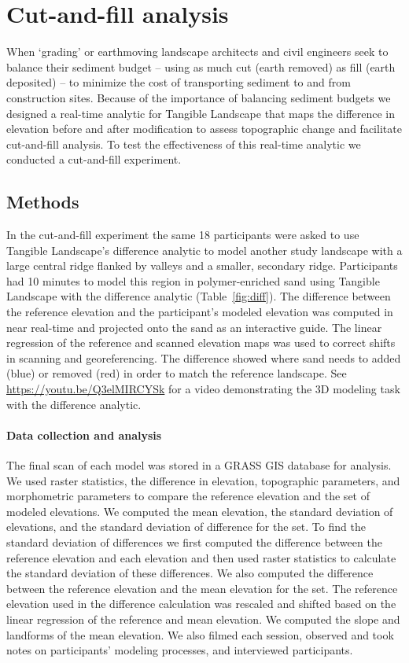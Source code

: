 \documentclass[Afour,sagev,times]{sagej} %
\begin{document}
\section{Cut-and-fill analysis}
When `grading' or earthmoving
landscape architects and civil engineers
seek to balance their sediment budget 
-- using as much cut (earth removed) 
as fill (earth deposited) --
to minimize the cost of transporting sediment 
to and from construction sites.
Because of the importance 
of balancing sediment budgets
we designed a real-time analytic 
for Tangible Landscape that 
maps the difference in elevation
before and after modification
to assess topographic change and
facilitate cut-and-fill analysis. 
To test the effectiveness of this real-time analytic
we conducted a cut-and-fill experiment.

\subsection{Methods}
In the cut-and-fill experiment 
the same 18 participants were asked to use 
Tangible Landscape's difference analytic to model 
another study landscape
with a large central ridge 
flanked by valleys 
and a smaller, secondary ridge.
Participants had 10 minutes to model this region
in polymer-enriched sand using Tangible Landscape 
with the difference analytic (Table~\ref{fig:diff}). 
The difference between the reference elevation 
and the participant's modeled elevation
was computed in near real-time and projected onto the sand 
as an interactive guide.
The linear regression of the reference and scanned elevation maps 
was used to correct shifts in scanning and georeferencing. 
The difference showed where 
sand needs to added (blue) or removed (red) 
in order to match the reference landscape.
See \url{https://youtu.be/Q3elMIRCYSk}
for a video demonstrating the 3D modeling task 
with the difference analytic.

\paragraph{Data collection and analysis}
The final scan of each model was stored in a 
GRASS GIS database for analysis. 
We used raster statistics, the difference in elevation, 
topographic parameters, and morphometric parameters
to compare the reference elevation 
and the set of modeled elevations. 
We computed 
the mean elevation,
the standard deviation of elevations, 
and the standard deviation of difference for the set.
To find the standard deviation of differences 
we first computed the difference 
between the reference elevation and each elevation 
and then used raster statistics 
to calculate the standard deviation of these differences.
We also computed the difference between the 
reference elevation and the mean elevation for the set. 
The reference elevation used in the difference calculation 
was rescaled and shifted based on the 
linear regression of the reference and mean elevation.
We computed the slope and landforms of the mean elevation. 
We also filmed each session, 
observed and took notes on participants' modeling processes, 
and interviewed participants.
\end{document}
